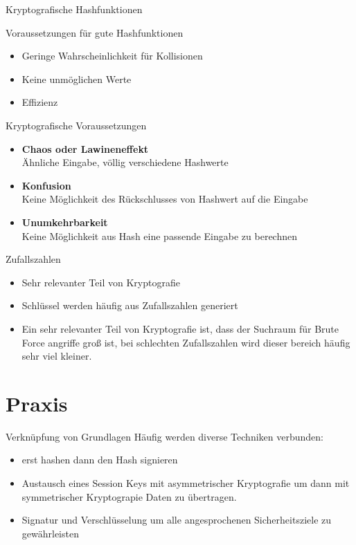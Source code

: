 \documentclass[10pt]{beamer}
\begin{document}
	\begin{frame}{Kryptografische Hashfunktionen}
		\begin{alertblock}{Voraussetzungen für gute Hashfunktionen}
			\begin{itemize}
				\item Geringe Wahrscheinlichkeit für Kollisionen
				\item Keine unmöglichen Werte
				\item Effizienz
			\end{itemize}
		\end{alertblock}
		\begin{alertblock}{Kryptografische Voraussetzungen}
			\begin{itemize}
				\item \textbf{Chaos oder Lawineneffekt}\\
				Ähnliche Eingabe, völlig verschiedene Hashwerte
				\item \textbf{Konfusion}\\
				Keine Möglichkeit des Rückschlusses von Hashwert auf die Eingabe
				\item \textbf{Unumkehrbarkeit}\\
				Keine Möglichkeit aus Hash eine passende Eingabe zu berechnen
			\end{itemize}
			
		\end{alertblock}
	\end{frame}

	\begin{frame}{Zufallszahlen}
		\begin{itemize}
			\item Sehr relevanter Teil von Kryptografie
			\item Schlüssel werden häufig aus Zufallszahlen generiert
			\item Ein sehr relevanter Teil von Kryptografie ist, dass der Suchraum für Brute Force angriffe groß ist, bei schlechten Zufallszahlen wird dieser bereich häufig sehr viel kleiner.
		\end{itemize}
	\end{frame}
	
	\section{Praxis}
	
	\begin{frame}{Verknüpfung von Grundlagen}
		Häufig werden diverse Techniken verbunden:
		\begin{itemize}
			\item erst hashen dann den Hash signieren
			\item Austausch eines Session Keys mit asymmetrischer Kryptografie um dann mit symmetrischer Kryptograpie Daten zu übertragen.
			\item Signatur und Verschlüsselung um alle angesprochenen Sicherheitsziele zu gewährleisten
		\end{itemize}
	\end{frame}
\end{document}
